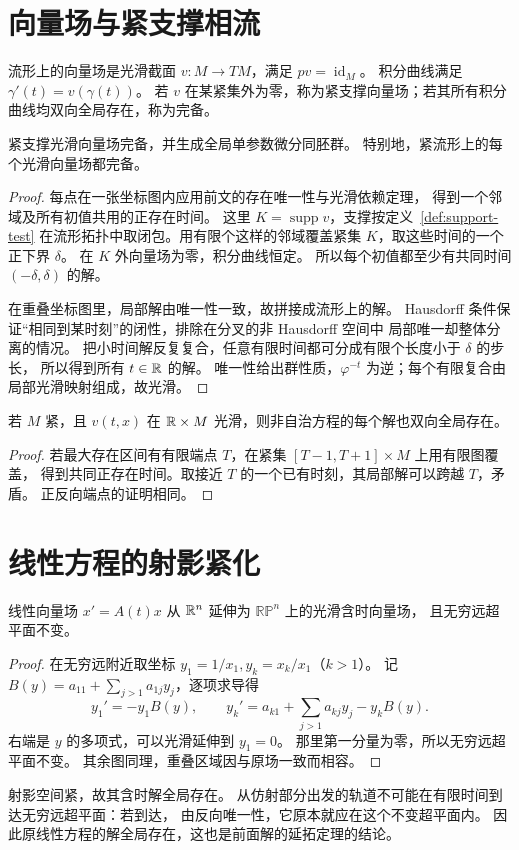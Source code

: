 \section{向量场与紧支撑相流}
\begin{definition}
流形上的向量场是光滑截面 $v:M\to TM$，满足 $pv=\operatorname{id}_M$。
积分曲线满足 $\gamma'(t)=v(\gamma(t))$。
若 $v$ 在某紧集外为零，称为紧支撑向量场；若其所有积分曲线均双向全局存在，称为完备。
\end{definition}
\begin{theorem}[紧支撑完备性]\label{thm:arnold-compact-flow}
紧支撑光滑向量场完备，并生成全局单参数微分同胚群。
特别地，紧流形上的每个光滑向量场都完备。
\end{theorem}
\begin{proof}
每点在一张坐标图内应用前文的存在唯一性与光滑依赖定理，
得到一个邻域及所有初值共用的正存在时间。
这里 $K=\operatorname{supp}v$，支撑按定义~\ref{def:support-test} 在流形拓扑中取闭包。用有限个这样的邻域覆盖紧集 $K$，取这些时间的一个正下界 $\delta$。
在 $K$ 外向量场为零，积分曲线恒定。
所以每个初值都至少有共同时间 $(-\delta,\delta)$ 的解。

在重叠坐标图里，局部解由唯一性一致，故拼接成流形上的解。
Hausdorff 条件保证“相同到某时刻”的闭性，排除在分叉的非 Hausdorff 空间中
局部唯一却整体分离的情况。
把小时间解反复复合，任意有限时间都可分成有限个长度小于 $\delta$ 的步长，
所以得到所有 $t\in\mathbb{R}$ 的解。
唯一性给出群性质，$\varphi^{-t}$ 为逆；每个有限复合由局部光滑映射组成，故光滑。
\end{proof}
\begin{corollary}
若 $M$ 紧，且 $v(t,x)$ 在 $\mathbb{R}\times M$ 光滑，则非自治方程的每个解也双向全局存在。
\end{corollary}
\begin{proof}
若最大存在区间有有限端点 $T$，在紧集 $[T-1,T+1]\times M$ 上用有限图覆盖，
得到共同正存在时间。取接近 $T$ 的一个已有时刻，其局部解可以跨越 $T$，矛盾。
正反向端点的证明相同。
\end{proof}

\section{线性方程的射影紧化}
\begin{proposition}
线性向量场 $x'=A(t)x$ 从 $\mathbb{R}^n$ 延伸为 $\mathbb{RP}^n$ 上的光滑含时向量场，
且无穷远超平面不变。
\end{proposition}
\begin{proof}
在无穷远附近取坐标 $y_1=1/x_1,y_k=x_k/x_1$（$k>1$）。
记 $B(y)=a_{11}+\sum_{j>1}a_{1j}y_j$，逐项求导得
\[
 y_1'=-y_1B(y),\qquad
 y_k'=a_{k1}+\sum_{j>1}a_{kj}y_j-y_kB(y).
\]
右端是 $y$ 的多项式，可以光滑延伸到 $y_1=0$。
那里第一分量为零，所以无穷远超平面不变。
其余图同理，重叠区域因与原场一致而相容。
\end{proof}
射影空间紧，故其含时解全局存在。
从仿射部分出发的轨道不可能在有限时间到达无穷远超平面：若到达，
由反向唯一性，它原本就应在这个不变超平面内。
因此原线性方程的解全局存在，这也是前面解的延拓定理的结论。
